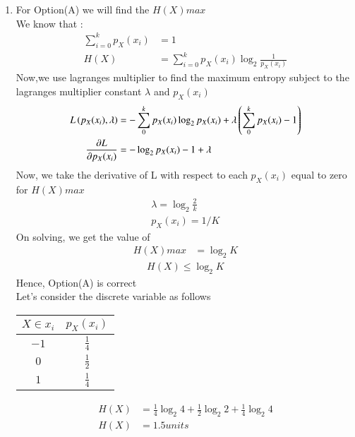 \documentclass[journal,12pt,onecolumn]{IEEEtran}
\theoremstyle{remark}
\begin{document}
\begin{enumerate}
\item For Option(A) we will find the $H(X)max$ \\
We know that :
\begin{align}
\sum_{i=0}^{k}p_X(x_i) &= 1\\
 H(X) &= \sum_{i=0}^{k}p_X(x_i) \log _{2} \frac{1}{p_X(x_i)}
 \end{align}
 Now,we use lagranges multiplier to find the maximum entropy subject to the lagranges multiplier constant 
$\lambda$ and $p_X(x_i)$
\begin{align}
L\left(p_X(x_i),\lambda\right) &= -\sum_{0}^{k}p_X(x_i) \log _{2}p_X(x_i) + \lambda\left(\sum_{0}^{k}p_X(x_i) - 1\right)\\
\frac{\partial L}{\partial p_X(x_i)} &= -\log _{2}p_X(x_i) -1 + \lambda
\end{align}
Now, we take the derivative of L with respect to each $p_X(x_i)$ equal to zero for $H(X)max$
\begin{align}
\lambda = \log _{2}\frac{2}{k}\\
p_X(x_i) = 1/K
\end{align}
 On solving, we get the value of 
 \begin{align}
 H(X)max &= \log _{2}K 
 \end{align}
 \begin{align}
 H(X) \leq \log _{2}K 
 \end{align}
 Hence, Option(A) is correct\\
Let's consider the discrete variable as follows
 \begin{table}[htpb]
\centering 
\begin{tabular}{|c|c|}
\hline
$X \in x_i$	&	$p_X(x_i)$\\
\hline
$-1$                         & $\frac{1}{4} $ \\
\hline
$0$                         & $\frac{1}{2}$  \\
\hline
$1$                         & $\frac{1}{4} $ \\
\hline
\end{tabular}
\end{table}
\begin{align}
H(X) &= \frac{1}{4}\log _{2}4 + \frac{1}{2}\log _{2}2 +\frac{1}{4}\log _{2}4\\
H(X) &=  1.5 units

\end{align}
\end{enumerate}
\end{document}
